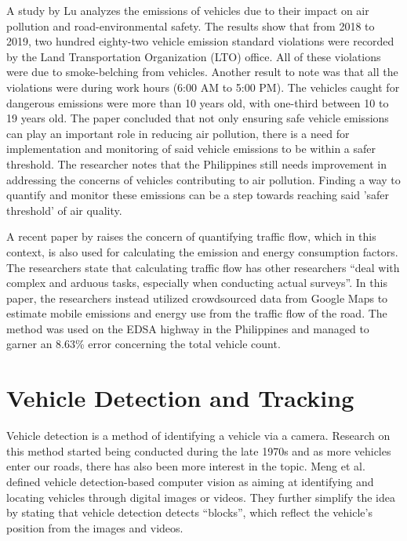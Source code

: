 A study by Lu \citeyear{lu_2022} analyzes the emissions of vehicles due to their impact on air pollution and road-environmental safety. The results show that from 2018 to 2019, two hundred eighty-two vehicle emission standard violations were recorded by the Land Transportation Organization (LTO) office. All of these violations were due to smoke-belching from vehicles. Another result to note was that all the violations were during work hours (6:00 AM to 5:00 PM). The vehicles caught for dangerous emissions were more than 10 years old, with one-third between 10 to 19 years old. The paper concluded that not only ensuring safe vehicle emissions can play an important role in reducing air pollution, there is a need for implementation and monitoring of said vehicle emissions to be within a safer threshold. The researcher notes that the Philippines still needs improvement in addressing the concerns of vehicles contributing to air pollution. Finding a way to quantify and monitor these emissions can be a step towards reaching said 'safer threshold' of air quality.

A recent paper by  raises the concern of quantifying traffic flow, which in this context, is also used for calculating the emission and energy consumption factors. The researchers state that calculating traffic flow has other researchers “deal with complex and arduous tasks, especially when conducting actual surveys”. In this paper, the researchers instead utilized crowdsourced data from Google Maps to estimate mobile emissions and energy use from the traffic flow of the road. The method was used on the EDSA highway in the Philippines and managed to garner an 8.63\% error concerning the total vehicle count.

\section{Vehicle Detection and Tracking}

	Vehicle detection is a method of identifying a vehicle via a camera. Research on this method started being conducted during the late 1970s \cite{NathDeb2012} and as more vehicles enter our roads, there has also been more interest in the topic. Meng et al. \citeyear{Meng_2020} defined vehicle detection-based computer vision as aiming at identifying and locating vehicles through digital images or videos. They further simplify the idea by stating that vehicle detection detects “blocks”, which reflect the vehicle’s position from the images and videos.

